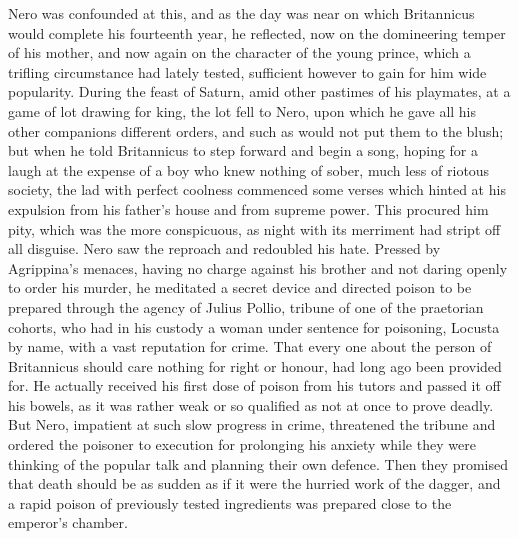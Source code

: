 Nero was confounded at this, and as the day was near on which Britannicus would complete his fourteenth year, he reflected, now on the domineering temper of his mother, and now again on the character of the young prince, which a trifling circumstance had lately tested, sufficient however to gain for him wide popularity. During the feast of Saturn, amid other pastimes of his playmates, at a game of lot drawing for king, the lot fell to Nero, upon which he gave all his other companions different orders, and such as would not put them to the blush; but when he told Britannicus to step forward and begin a song, hoping for a laugh at the expense of a boy who knew nothing of sober, much less of riotous society, the lad with perfect coolness commenced some verses which hinted at his expulsion from his father's house and from supreme power. This procured him pity, which was the more conspicuous, as night with its merriment had stript off all disguise. Nero saw the reproach and redoubled his hate. Pressed by Agrippina's menaces, having no charge against his brother and not daring openly to order his murder, he meditated a secret device and directed poison to be prepared through the agency of Julius Pollio, tribune of one of the praetorian cohorts, who had in his custody a woman under sentence for poisoning, Locusta by name, with a vast reputation for crime. That every one about the person of Britannicus should care nothing for right or honour, had long ago been provided for. He actually received his first dose of poison from his tutors and passed it off his bowels, as it was rather weak or so qualified as not at once to prove deadly. But Nero, impatient at such slow progress in crime, threatened the tribune and ordered the poisoner to execution for prolonging his anxiety while they were thinking of the popular talk and planning their own defence. Then they promised that death should be as sudden as if it were the hurried work of the dagger, and a rapid poison of previously tested ingredients was prepared close to the emperor's chamber.


